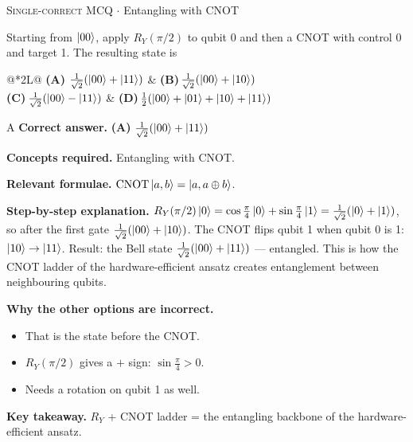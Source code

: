 \documentclass[11pt,a4paper]{article}
\newcommand{\optlabel}[1]{\textbf{(#1)}}
\newcommand{\correctlabel}[1]{\textcolor{okgreen}{\textbf{(#1)}\,\ding{51}}}
\newenvironment{qitem}[1]{\begin{list}{}{\setlength{\leftmargin}{3.3em}\setlength{\labelwidth}{3.1em}%
  \setlength{\labelsep}{0.2em}\setlength{\topsep}{3pt}\setlength{\parsep}{3pt}}\item[\textbf{Q.#1}\hfill]}{\end{list}}
\newcommand{\qsep}{\par\vspace{2pt}{\color{black!15}\hrule}\vspace{4pt}}
\newcommand{\qmeta}[2]{{\footnotesize\color{black!60}\textsc{#1} \;$\cdot$\; #2}\par}
\begin{document}
\begin{qitem}{27}
\qmeta{Single-correct MCQ}{Entangling with CNOT}
Starting from $\ket{00}$, apply $R_Y(\pi/2)$ to qubit 0 and then a CNOT with control 0 and target 1. The resulting state is
\par\smallskip\noindent\begin{tabularx}{\linewidth}{@{}*{2}{L}@{}}
\correctlabel{A}\,$\tfrac{1}{\sqrt2}(\ket{00} + \ket{11})$ & \optlabel{B}\,$\tfrac{1}{\sqrt2}(\ket{00} + \ket{10})$ \\[3pt]
\optlabel{C}\,$\tfrac{1}{\sqrt2}(\ket{00} - \ket{11})$ & \optlabel{D}\,$\tfrac12(\ket{00} + \ket{01} + \ket{10} + \ket{11})$
\end{tabularx}
\end{qitem}
\begin{solbox}{A}
\textbf{\color{brand}Correct answer.} \textcolor{okgreen}{\textbf{(A)}} $\tfrac{1}{\sqrt2}(\ket{00} + \ket{11})$

\textbf{\color{brand}Concepts required.} Entangling with CNOT.

\textbf{\color{brand}Relevant formulae.} $\mathrm{CNOT}\ket{a, b} = \ket{a, a\oplus b}$.

\textbf{\color{brand}Step-by-step explanation.} $R_Y(\pi/2)\ket0 = \cos\frac\pi4\ket0 + \sin\frac\pi4\ket1 = \frac{1}{\sqrt2}(\ket0 + \ket1)$, so after the first gate $\frac{1}{\sqrt2}(\ket{00} + \ket{10})$.
The CNOT flips qubit 1 when qubit 0 is 1: $\ket{10} \to \ket{11}$. Result: the Bell state $\frac{1}{\sqrt2}(\ket{00} + \ket{11})$ --- entangled. This is
how the CNOT ladder of the hardware-efficient ansatz creates entanglement between neighbouring qubits.

\textbf{\color{brand}Why the other options are incorrect.}
\begin{itemize}[leftmargin=2.4em, itemsep=1pt, topsep=2pt]
\item[\textbf{(B)}] That is the state before the CNOT.
\item[\textbf{(C)}] $R_Y(\pi/2)$ gives a $+$ sign: $\sin\frac\pi4 > 0$.
\item[\textbf{(D)}] Needs a rotation on qubit 1 as well.
\end{itemize}
\textbf{\color{brand}Key takeaway.} $R_Y$ + CNOT ladder = the entangling backbone of the hardware-efficient ansatz.
\end{solbox}
\qsep
\end{document}
